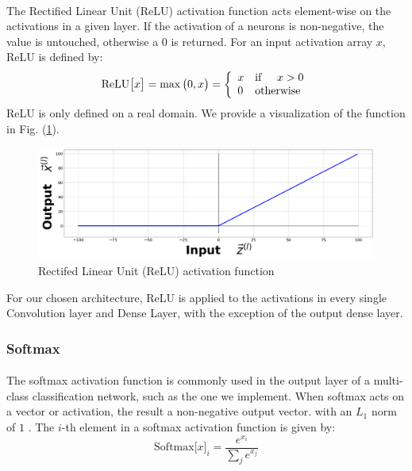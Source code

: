 \documentclass[12pt,letterpaper]{article}
\begin{document}
\paragraph*{}The Rectified Linear Unit (ReLU) activation function acts element-wise on the activations in a given layer. If the activation of a neurons is non-negative, the value is untouched, otherwise a $0$ is returned. For an input activation array $x$, ReLU is defined by:
\begin{equation}
\label{eqn-ReLU}
\text{ReLU}\big[x\big] = \max\big(0,x\big) = \left\{
\begin{array}{ll}
    x & \text{if\hspace{0.5cm}} x > 0 \\
    0 & \text{otherwise}
\end{array} 
\right.
\end{equation}
ReLU is only defined on a real domain. We provide a visualization of the function in Fig. (\ref{fig-ReLU}).
\begin{figure}[H]
\begin{center}
\includegraphics[scale=0.25]{../Figures/RectifiedLinearUnit}
\end{center}
\caption{Rectifed Linear Unit (ReLU) activation function}
\label{fig-ReLU}
\end{figure}
For our chosen architecture, ReLU is applied to the activations in every single Convolution layer and Dense Layer, with the exception of the output dense layer.


\subsubsection{Softmax}
\label{subsubsec-Softmax}

\paragraph*{}The softmax activation function is commonly used in the output layer of a multi-class classification network, such as the one we implement. When softmax acts on a vector or activation, the result a non-negative output vector. with an $L_1$ norm of $1$ \cite{Geron,Goodfellow,Virtanen}. The $i$-th element in a softmax activation function is given by:
\begin{equation}
\label{eqn-Softmax}
\text{Softmax}\big[ x \big]_{i} = \frac{e^{x_i}}{\sum_{j}e^{x_j}}
\end{equation}
\end{document}
